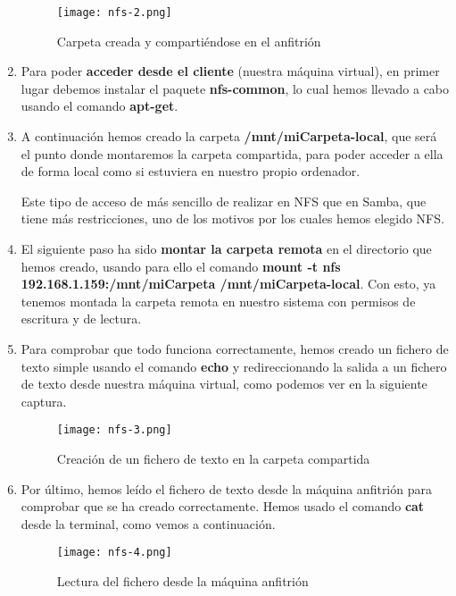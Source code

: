\begin{enumerate}
    \begin{figure}[H]
        \centering
        \texttt{[image: nfs-2.png]}
        \caption{Carpeta creada y compartiéndose en el anfitrión}
    \end{figure}

    \item Para poder \textbf{acceder desde el cliente} (nuestra máquina virtual), en primer lugar debemos instalar el paquete \textbf{nfs-common}, lo cual hemos llevado a cabo usando el comando \textbf{apt-get}.

    \item A continuación hemos creado la carpeta \textbf{/mnt/miCarpeta-local}, que será el punto donde montaremos la carpeta compartida, para poder acceder a ella de forma local como si estuviera en nuestro propio ordenador.

    Este tipo de acceso de más sencillo de realizar en NFS que en Samba, que tiene más restricciones, uno de los motivos por los cuales hemos elegido NFS.

    \item El siguiente paso ha sido \textbf{montar la carpeta remota} en el directorio que hemos creado, usando para ello el comando \textbf{mount -t nfs 192.168.1.159:/mnt/miCarpeta /mnt/miCarpeta-local}. Con esto, ya tenemos montada la carpeta remota en nuestro sistema con permisos de escritura y de lectura.

    \item Para comprobar que todo funciona correctamente, hemos creado un fichero de texto simple usando el comando \textbf{echo} y redireccionando la salida a un fichero de texto desde nuestra máquina virtual, como podemos ver en la siguiente captura.

    \begin{figure}[H]
        \centering
        \texttt{[image: nfs-3.png]}
        \caption{Creación de un fichero de texto en la carpeta compartida}
    \end{figure}

    \item Por último, hemos leído el fichero de texto desde la máquina anfitrión para comprobar que se ha creado correctamente. Hemos usado el comando \textbf{cat} desde la terminal, como vemos a continuación.

    \begin{figure}[H]
        \centering
        \texttt{[image: nfs-4.png]}
        \caption{Lectura del fichero desde la máquina anfitrión}
    \end{figure}
\end{enumerate}

